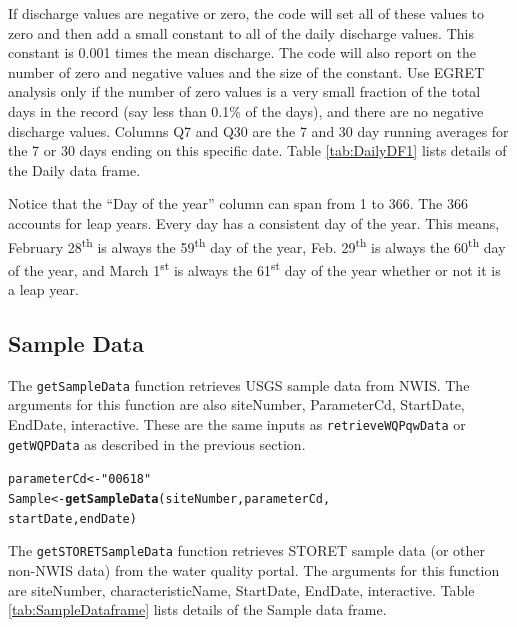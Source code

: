 \documentclass[a4paper,11pt]{article}\usepackage[]{graphicx}\usepackage[]{color}
\makeatletter
\newcommand{\hlstr}[1]{\textcolor[rgb]{0.192,0.494,0.8}{#1}}%
\newcommand{\hlstd}[1]{\textcolor[rgb]{0.345,0.345,0.345}{#1}}%
\newcommand{\hlkwb}[1]{\textcolor[rgb]{0.69,0.353,0.396}{#1}}%
\newcommand{\hlkwd}[1]{\textcolor[rgb]{0.737,0.353,0.396}{\textbf{#1}}}%
\newenvironment{kframe}{%
 \def\at@end@of@kframe{}%
 \ifinner\ifhmode%
  \def\at@end@of@kframe{\end{minipage}}%
  \begin{minipage}{\columnwidth}%
 \fi\fi%
 \def\FrameCommand##1{\hskip\@totalleftmargin \hskip-\fboxsep
 \colorbox{shadecolor}{##1}\hskip-\fboxsep
     \hskip-\linewidth \hskip-\@totalleftmargin \hskip\columnwidth}%
 \MakeFramed {\advance\hsize-\width
   \@totalleftmargin\z@ \linewidth\hsize
   \@setminipage}}%
 {\par\unskip\endMakeFramed%
 \at@end@of@kframe}
\newenvironment{knitrout}{}{} %
\makeatother
\begin{document}
If discharge values are negative or zero, the code will set all of these values to zero and then add a small constant to all of the daily discharge values.  This constant is 0.001 times the mean discharge.  The code will also report on the number of zero and negative values and the size of the constant.  Use EGRET analysis only if the number of zero values is a very small fraction of the total days in the record (say less than 0.1\% of the days), and there are no negative discharge values.  Columns Q7 and Q30 are the 7 and 30 day running averages for the 7 or 30 days ending on this specific date. Table \ref{tab:DailyDF1} lists details of the Daily data frame.

Notice that the \enquote{Day of the year} column can span from 1 to 366. The 366 accounts for leap years. Every day has a consistent day of the year. This means, February 28\textsuperscript{th} is always the 59\textsuperscript{th} day of the year, Feb. 29\textsuperscript{th} is always the 60\textsuperscript{th} day of the year, and March 1\textsuperscript{st} is always the 61\textsuperscript{st} day of the year whether or not it is a leap year.

\FloatBarrier

\subsection{Sample Data}
\label{Samplesubsection}
The \texttt{getSampleData} function retrieves USGS sample data from NWIS. The arguments for this function are also siteNumber, ParameterCd, StartDate, EndDate, interactive. These are the same inputs as \texttt{retrieveWQPqwData} or \texttt{getWQPData} as described in the previous section.

\begin{knitrout}
\color{fgcolor}\begin{kframe}
\begin{alltt}
\hlstd{parameterCd} \hlkwb{<-} \hlstr{"00618"}
\hlstd{Sample} \hlkwb{<-}\hlkwd{getSampleData}\hlstd{(siteNumber,parameterCd,}
      \hlstd{startDate, endDate)}
\end{alltt}
\end{kframe}
\end{knitrout}

The \texttt{getSTORETSampleData} function retrieves STORET sample data (or other non-NWIS data) from the water quality portal. The arguments for this function are siteNumber, characteristicName, StartDate, EndDate, interactive. Table \ref{tab:SampleDataframe} lists details of the Sample data frame. 
\end{document}
